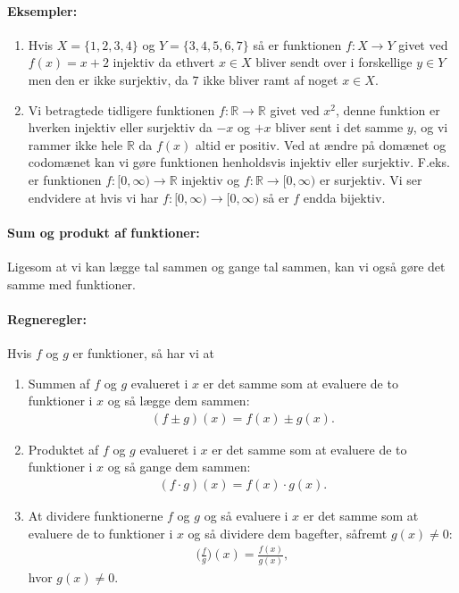 \paragraph*{Eksempler:}
\begin{enumerate}
\item Hvis $X=\{1,2,3,4\}$ og $Y= \{3,4,5,6,7\}$ så er funktionen $f \colon X \to Y$ givet ved $f(x)=x+2$ injektiv da ethvert $x \in X$ bliver sendt over i forskellige $y \in Y$ men den er ikke surjektiv, da $7$ ikke bliver ramt af noget $x \in X$.
\item Vi betragtede tidligere funktionen $f \colon \mathbb{R} \to \mathbb{R}$ givet ved $x^2$, denne funktion er hverken injektiv eller surjektiv da $-x$ og $+x$ bliver sent i det samme $y$, og vi rammer ikke hele $\mathbb{R}$ da $f(x)$ altid er positiv. Ved at ændre på domænet og codomænet kan vi gøre funktionen henholdsvis injektiv eller surjektiv. F.eks. er funktionen $f \colon [0,\infty) \to \mathbb{R}$ injektiv og $f \colon \mathbb{R} \to [0,\infty)$ er surjektiv. Vi ser endvidere at hvis vi har $f \colon [0,\infty) \to [0,\infty)$ så er $f$ endda bijektiv.
\end{enumerate}

\paragraph*{Sum og produkt af funktioner:}
Ligesom at vi kan lægge tal sammen og gange tal sammen, kan vi også gøre det samme med funktioner.

\paragraph*{Regneregler:}
Hvis $f$ og $g$ er funktioner, så har vi at
\begin{enumerate}
\item Summen af $f$ og $g$ evalueret i $x$ er det samme som at evaluere de to funktioner i $x$ og så lægge dem sammen:
\begin{align*}
(f\pm g)(x)=f(x) \pm g(x).
\end{align*}
\item Produktet af $f$ og $g$ evalueret i $x$ er det samme som at evaluere de to funktioner i $x$ og så gange dem sammen: 
\begin{align*}
(f \cdot g)(x)=f(x) \cdot g(x).
\end{align*}
\item At dividere funktionerne $f$ og $g$ og så evaluere i $x$ er det samme som at evaluere de to funktioner i $x$ og så dividere dem bagefter, såfremt $g(x)\neq 0$:
\begin{align*}
\Big(\frac{f}{g}\Big) (x) = \frac{f(x)}{g(x)},
\end{align*}
hvor $g(x) \neq 0$.
\end{enumerate}

